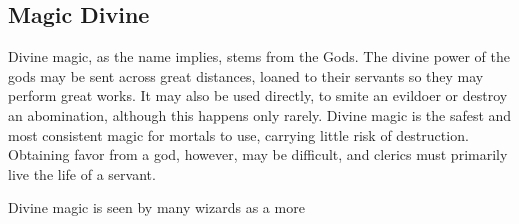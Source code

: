 \begin{multicols}{2}
\section{Magic Divine}
Divine magic, as the name implies, stems from the Gods.
The divine power of the gods may be sent across great distances, loaned to their servants so they may perform great works.
It may also be used directly, to smite an evildoer or destroy an abomination, although this happens only rarely.
Divine magic is the safest and most consistent magic for mortals to use, carrying little risk of destruction.
Obtaining favor from a god, however, may be difficult, and clerics must primarily live the life of a servant.

Divine magic is seen by many wizards as a more 
\end{multicols}
 

